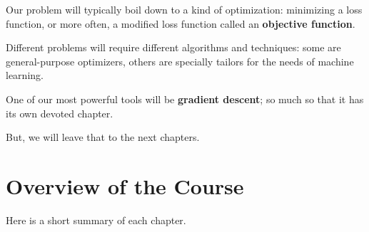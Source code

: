     Our problem will typically boil down to a kind of optimization: minimizing a loss function, or more often, a modified loss function called an \textbf{objective function}.
    
    Different problems will require different algorithms and techniques: some are general-purpose optimizers, others are specially tailors for the needs of machine learning.
    
    One of our most powerful tools will be \textbf{gradient descent}; so much so that it has its own devoted chapter.
    
    But, we will leave that to the next chapters.


\section{Overview of the Course}

    Here is a short summary of each chapter.
    
